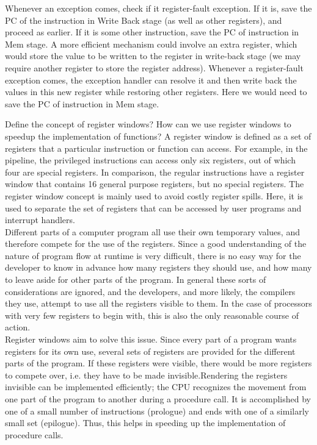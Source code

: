 \begin{ExerciseList}
\Answer
Whenever an exception comes, check if it register-fault exception. If it is,
save the PC of the instruction in Write Back stage (as well as other
registers), and proceed as earlier. If it is some other instruction, save the
PC of instruction in Mem stage.
A more efficient mechanism could involve an extra register, which would store
the value to be written to the register in write-back stage (we may require
another register to store the register address). Whenever a register-fault
exception comes, the exception 
handler can resolve it and then write back the values in this new register
while restoring other registers. Here we would need to save the PC of
instruction in Mem stage. 

\Exercise[difficulty=1]
Define the concept of register windows? How can we use register windows to speedup
the implementation of functions?
\Answer
A register window is defined as a set of registers that a particular instruction or function can access. For example, in the \simplerisc pipeline, the privileged instructions can access only six registers, out of which four are special registers. In comparison, the regular instructions have a register window that contains 16 general purpose registers, but no special registers.
The register window concept is mainly used to avoid costly register spills. Here, it is used to separate the set of registers that can be accessed by user programs and interrupt handlers. \\
Different parts of a computer program all use their own temporary values, and therefore compete for the use of the registers. Since a good understanding of the nature of program flow at runtime is very difficult, there is no easy way for the developer to know in advance how many registers they should use, and how many to leave aside for other parts of the program. In general these sorts of considerations are ignored, and the developers, and more likely, the compilers they use, attempt to use all the registers visible to them. In the case of processors with very few registers to begin with, this is also the only reasonable course of action. \\
Register windows aim to solve this issue. Since every part of a program wants registers for its own use, several sets of registers are provided for the different parts of the program. If these registers were visible, there would be more registers to compete over, i.e. they have to be made invisible.Rendering the registers invisible can be implemented efficiently; the CPU recognizes the movement from one part of the program to another during a procedure call. It is accomplished by one of a small number of instructions (prologue) and ends with one of a similarly small set (epilogue). Thus, this helps in speeding up the implementation of procedure calls.
\end{ExerciseList}

